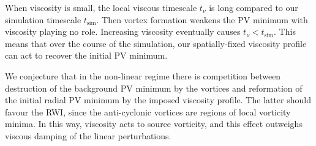 When viscosity is small, the local viscous timescale $t_\nu$ is long compared to our
simulation timescale $t_\mathrm{sim}$. Then vortex formation weakens the PV minimum
with viscosity playing no role. Increasing viscosity eventually causes
$t_\nu<t_\mathrm{sim}$. This means that over the course of the
simulation, our spatially-fixed viscosity profile can act to recover the
initial PV minimum.  

We conjecture that in the non-linear regime there is competition 
between destruction of the background PV minimum by the 
vortices and reformation of the initial radial PV minimum by the
imposed viscosity profile. The latter should favour the RWI, since the
anti-cyclonic vortices are regions of local vorticity minima. In this
way, viscosity acts to source vorticity, and this effect outweighs
viscous damping of the linear perturbations.   
 



